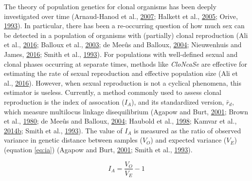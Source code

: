 \documentclass[double,12pt]{beavtex}
\begin{document}
  The theory of population genetics for clonal organisms has been deeply
  investigated over time (Arnaud-Hanod et al.,
  \protect\hyperlink{ref-arnaud2007standardizing}{2007}; Halkett et al.,
  \protect\hyperlink{ref-halkett2005tackling}{2005}; Orive,
  \protect\hyperlink{ref-orive1993effective}{1993}). In particular, there
  has been a re-occurring question of how much sex can be detected in a
  population of organisms with (partially) clonal reproduction (Ali et
  al., \protect\hyperlink{ref-ali2016cloncase}{2016}; Balloux et al.,
  \protect\hyperlink{ref-balloux2003population}{2003}; de Meeûs and
  Balloux, \protect\hyperlink{ref-de2004clonal}{2004}; Nieuwenhuis and
  James, \protect\hyperlink{ref-nieuwenhuis2016frequency}{2016}; Smith et
  al., \protect\hyperlink{ref-smith1993how}{1993}). For populations with
  well-defined sexual and clonal phases occurring at separate times,
  methods like \emph{CloNcaSe} are effective for estimating the rate of
  sexual reproduction and effective population size (Ali et al.,
  \protect\hyperlink{ref-ali2016cloncase}{2016}). However, when sexual
  reproduction is not a cyclical phenomena, this estimator is useless.
  Currently, a method commonly used to assess clonal reproduction is the
  index of assocation (\(I_A\)), and its standardized version,
  \(\bar{r}_d\), which measure multilocus linkage disequilibrium (Agapow
  and Burt, \protect\hyperlink{ref-Agapow_2001}{2001}; Brown et al.,
  \protect\hyperlink{ref-brown1980multilocus}{1980}; de Meeûs and Balloux,
  \protect\hyperlink{ref-de2004clonal}{2004}; Haubold et al.,
  \protect\hyperlink{ref-haubold1998detecting}{1998}; Kamvar et al.,
  \protect\hyperlink{ref-kamvar2014poppr}{2014}\protect\hyperlink{ref-kamvar2014poppr}{b};
  Smith et al., \protect\hyperlink{ref-smith1993how}{1993}). The value of
  \(I_A\) is measured as the ratio of observed variance in genetic
  distance between samples (\(V_O\)) and expected variance (\(V_E\))
  (equation \eqref{eq:ia}) (Agapow and Burt,
  \protect\hyperlink{ref-Agapow_2001}{2001}; Smith et al.,
  \protect\hyperlink{ref-smith1993how}{1993}).
  
  \begin{equation}
  I_A = \frac{V_O}{V_E} - 1 \label{eq:ia}
  \end{equation}
  
\end{document}
